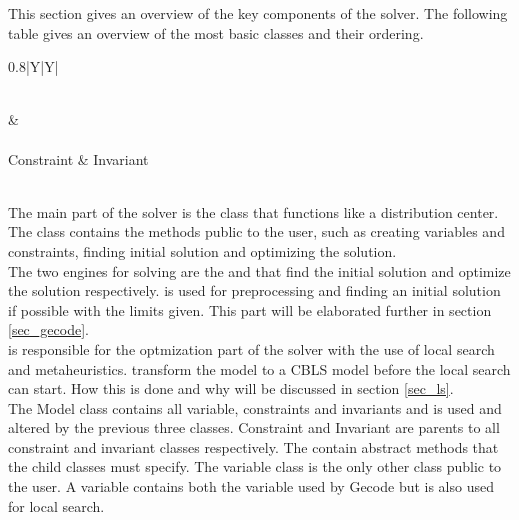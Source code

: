 This section gives an overview of the key components of the solver. The following table gives an overview of the most 
basic classes and their ordering. \\ 
\begin{table}[h]
\Large
\def\arraystretch{1.5}
\centering
\label{keyStruc}
\begin{tabularx}{0.8\textwidth}{|Y|Y|}%

\hline
{}  \\ \hline
\gecodesol      & \lssol       \\ \hline
{}    \\ \hline
Constraint      & Invariant    \\ \hline
{} \\ \hline
\end{tabularx}\caption{Ordering of key classes}
\end{table}

\noindent
The main part of the solver is the \gensol class that functions like a distribution center. The \gensol class contains 
the methods public to the user, such as creating variables and constraints, finding initial solution and optimizing the 
solution. \\ 
The two engines for solving are the \gecodesol and \lssol that find the initial solution and optimize the solution 
respectively. \gecodesol is used for preprocessing and finding an initial solution if possible with the limits given. 
This part will be elaborated further in section \ref{sec_gecode}. \\
\lssol is responsible for the optmization part of the solver with the use of local search and metaheuristics. \lssol 
transform the model to a CBLS model before the local search can start. How this is done and why will be discussed in 
section \ref{sec_ls}. \\ 
The Model class contains all variable, constraints and invariants and is used and altered by the previous three 
classes. Constraint and Invariant are parents to all constraint and invariant classes respectively. The contain 
abstract methods that the child classes must specify. The variable class is the only other class public to the user. A 
variable contains both the variable used by Gecode but is also used for local search. \\



